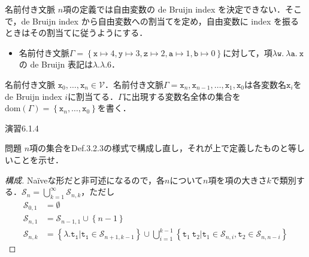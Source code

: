 \documentclass[9pt]{beamer}
\begin{document}
\begin{frame}{名前付き文脈}
$n$項の定義では自由変数の de Bruijn index を決定できない．そこで，de Bruijn index から自由変数への割当てを定め，自由変数に index を振るときはその割当てに従うようにする．\begin{itemize}
\item 名前付き文脈$\Gamma =\left\{\mathtt{x}\mapsto 4, \mathtt{y}\mapsto 3, \mathtt{z}\mapsto 2, \mathtt{a}\mapsto 1, \mathtt{b}\mapsto 0\right\}$に対して，項$\mathtt{\lambda w.\ \lambda a.\ x}$の de Bruijn 表記は$\mathtt{\lambda .\lambda .6}$．
\end{itemize}
\begin{dblock}{名前付き文脈}
$\mathtt{x}_{0},\ldots,\mathtt{x}_{n}\in\mathcal{V}$．名前付き文脈$\Gamma = \mathtt{x}_{n},\mathtt{x}_{n - 1},\ldots,\mathtt{x}_{1},\mathtt{x}_{0}$は各変数名$\mathtt{x}_{i}$を de Bruijn index $i$に割当てる．$\Gamma$に出現する変数名全体の集合を$\mathrm{dom}(\Gamma) =\left\{\mathtt{x}_{n},\ldots,\mathtt{x}_{0}\right\}$を書く．
\end{dblock}
\end{frame}
\begin{frame}{演習6.1.4}
\begin{alertblock}{問題}
	$n$項の集合をDef.3.2.3の様式で構成し直し，それが上で定義したものと等しいことを示せ．
\end{alertblock}
\begin{proof}[構成]
	Na\"iveな形だと非可述になるので，各$n$について$n$項を項の大きさ$k$で類別する．$\mathcal{S}_{n} = \bigcup_{k = 1}^{\infty}\mathcal{S}_{n,k}$，ただし
	\begin{align*}
	\mathcal{S}_{0,1} &= \emptyset\\
	\mathcal{S}_{n,1} &= \mathcal{S}_{n - 1, 1} \cup \left\{n -1\right\}\\
	\mathcal{S}_{n,k} &= \left\{\lambda.\mathtt{t_{1}}|\mathtt{t_{1}}\in \mathcal{S}_{n + 1, k - 1}\right\}\cup \bigcup_{i = 1}^{k - 1}\left\{\mathtt{t}_{1}\ \mathtt{t}_{2}|\mathtt{t}_{1}\in\mathcal{S}_{n, i}, \mathtt{t}_{2}\in\mathcal{S}_{n, n- i}\right\}
	\end{align*}
\end{proof}
\end{frame}
\end{document}
